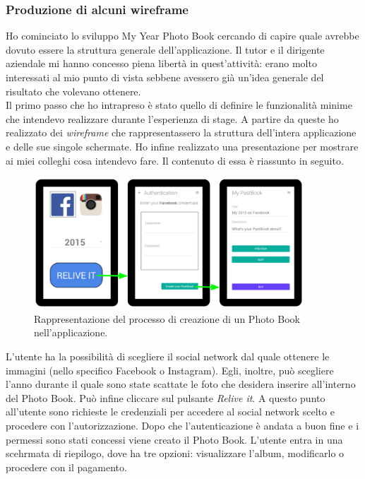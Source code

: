 			\subsubsection{Produzione di alcuni wireframe}
				Ho cominciato lo sviluppo My Year Photo Book cercando di capire quale avrebbe dovuto essere la struttura generale
				dell'applicazione. Il tutor e il dirigente aziendale mi hanno concesso piena libertà in quest'attività: erano molto
				interessati al mio punto di vista sebbene avessero già un'idea generale del risultato che volevano ottenere.\\
				Il primo passo che ho intrapreso è stato quello di definire le funzionalità minime che intendevo realizzare durante
				l'esperienza di stage. A partire da queste ho realizzato dei \emph{wireframe} che rappresentassero la struttura
				dell'intera applicazione e delle sue singole schermate. Ho infine realizzato una presentazione per mostrare ai miei
				colleghi cosa intendevo fare. Il contenuto di essa è riassunto in seguito.\\
				\begin{figure}[H]
					\centering
					\includegraphics[width=0.9\textwidth]{capitolo_3/immagini/wireframe_1.png}
					\caption{Rappresentazione del processo di creazione di un Photo Book nell'applicazione.}
				\end{figure}
				\noindent L'utente ha la possibilità di scegliere il social network dal quale ottenere le immagini (nello specifico
				Facebook o Instagram). Egli, inoltre, può scegliere l'anno durante il quale sono state scattate le foto che desidera
				inserire all'interno del Photo Book. Può infine cliccare sul pulsante \emph{Relive it}. A questo punto all'utente
				sono richieste le credenziali per accedere al social network scelto e procedere con l'autorizzazione. Dopo che
				l'autenticazione è andata a buon fine e i permessi sono stati concessi viene creato il Photo Book. L'utente entra
				in una scehrmata di riepilogo, dove ha tre opzioni: visualizzare l'album, modificarlo o procedere con il pagamento.

